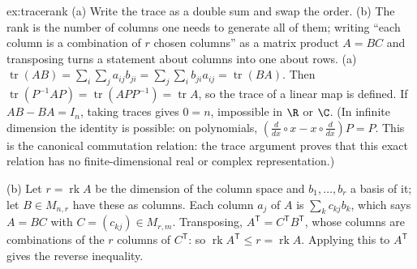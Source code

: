 \begin{solution}{ex:tracerank}
\idea (a) Write the trace as a double sum and swap the order. (b) The rank is the number of columns one needs to generate all of them; writing ``each column is a combination of $r$ chosen columns'' as a matrix product $A=BC$ and transposing turns a statement about columns into one about rows.
\writeup (a) $\operatorname{tr}(AB)=\sum_i\sum_ja_{ij}b_{ji}=\sum_j\sum_ib_{ji}a_{ij}=\operatorname{tr}(BA)$. Then $\operatorname{tr}(P^{-1}AP)=\operatorname{tr}(APP^{-1})=\operatorname{tr}A$, so the trace of a linear map is defined. If $AB-BA=I_n$, taking traces gives $0=n$, impossible in $\R$ or $\C$. (In infinite dimension the identity is possible: on polynomials, $(\frac{d}{dx}\circ x-x\circ\frac{d}{dx})P=P$. This is the canonical commutation relation: the trace argument proves that this exact relation has no finite-dimensional real or complex representation.)

(b) Let $r=\operatorname{rk}A$ be the dimension of the column space and $b_1,\dots,b_r$ a basis of it; let $B\in M_{n,r}$ have these as columns. Each column $a_j$ of $A$ is $\sum_kc_{kj}b_k$, which says $A=BC$ with $C=(c_{kj})\in M_{r,m}$. Transposing, $A^{\mathsf T}=C^{\mathsf T}B^{\mathsf T}$, whose columns are combinations of the $r$ columns of $C^{\mathsf T}$: so $\operatorname{rk}A^{\mathsf T}\le r=\operatorname{rk}A$. Applying this to $A^{\mathsf T}$ gives the reverse inequality.
\end{solution}

